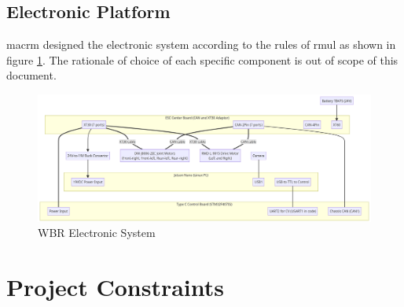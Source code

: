 \documentclass[12pt]{article}
\begin{document}
\subsection{Electronic Platform}
\acrshort{macrm} designed the electronic system according to the rules of \acrshort{rmul} as shown in figure \ref{fig:WBR Electronic System}. The rationale of choice of each specific component is out of scope of this document.
\begin{figure}
    \centering
    \includegraphics[width=\textwidth,height=\textheight,keepaspectratio]{../Electronic System Diagram.png}
    \caption{WBR Electronic System}
    \label{fig:WBR Electronic System}
\end{figure}

\section{Project Constraints}
\end{document}
